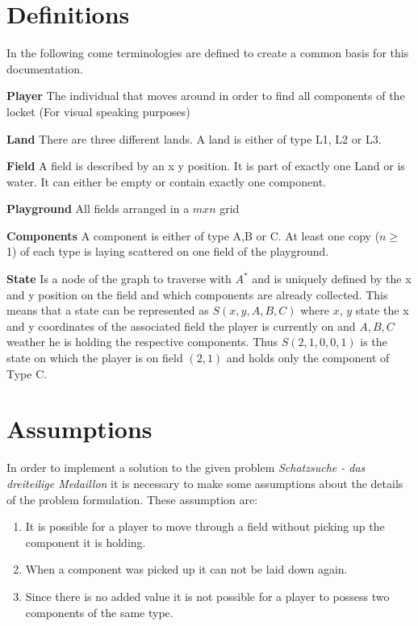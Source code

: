 \documentclass{article}
\newcommand{\problem}{Schatzsuche - das dreiteilige Medaillon}
\begin{document}
\section{Definitions}
In the following come terminologies are defined to create a common basis for this documentation.
\begin{description}
    \item{\textbf{Player}} The individual that moves around in order to find all components of the locket (For visual speaking purposes)
    \item{\textbf{Land}} There are three different lands. A land is either of type L1, L2 or L3.
    \item{\textbf{Field}} A field is described by an x y position. It is part of exactly one Land or is water. It can either be empty or contain exactly one component.
    \item{\textbf{Playground}} All fields arranged in a $m x n$ grid
    \item{\textbf{Components}} A component is either of type A,B or C. At least one copy ($n \geq \ $1) of each type is laying scattered on one field of the playground.
    \item{\textbf{State}\label{definition_state}}  Is a node of the graph to traverse with $A^*$ and is uniquely defined by the x and y position on the field and which components are already collected. 
    This means that a state can be represented as $S(x,y,A,B,C)$ where $x$, $y$ state the x and y coordinates of the associated field the player is currently on and $A, B, C$ weather he is holding the respective components. Thus $S(2,1,0,0,1)$ is the state on which the player is on field $(2,1)$ and holds only the component of Type C.
\end{description}

\section{Assumptions}
In order to implement a solution to the given problem \textit{\problem} it is necessary to make some assumptions about the details of the problem formulation. These assumption are:
\begin{enumerate}
    \item It is possible for a player to move through a field without picking up the component it is holding. 
    \item When a component was picked up it can not be laid down again.
    \item Since there is no added value it is not possible for a player to possess two components of the same type.
\end{enumerate}
\end{document}

